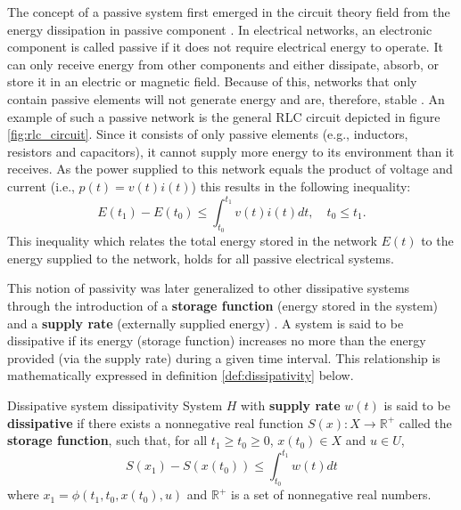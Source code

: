 The concept of a passive system first emerged in the circuit theory field from the energy dissipation in passive component \cite{popovHyperstabilityControlSystems1973}. In electrical networks, an electronic component is called passive if it does not require electrical energy to operate. It can only receive energy from other components and either dissipate, absorb, or store it in an electric or magnetic field. Because of this, networks that only contain passive elements will not generate energy and are, therefore, stable \cite{andersonNetworkAnalysisSynthesis2013}. An example of such a passive network is the general RLC circuit depicted in figure \ref{fig:rlc_circuit}. Since it consists of only passive elements (e.g., inductors, resistors and capacitors), it cannot supply more energy to its environment than it receives. As the power supplied to this network equals the product of voltage and current (i.e., $p \left( t \right)= v \left( t \right) i \left( t \right)$) this results in the following inequality:
\begin{equation}
  E \left( t_1 \right)- E \left( t_0 \right)\le\int_{ t_0 }^{ t_1 } v \left( t \right) i \left( t \right)dt, \quad t_0 \le t_1.
\end{equation}
This inequality which relates the total energy stored in the network $E\left(t\right)$ to the energy supplied to the network, holds for all passive electrical systems.

This notion of passivity was later generalized to other dissipative systems through the introduction of a \textbf{storage function} (energy stored in the system) and a \textbf{supply rate} (externally supplied energy) \cite{willemsDissipativeDynamicalSystems1972a,willemsDissipativeDynamicalSystems1972}. A system is said to be dissipative if its energy (storage function) increases no more than the energy provided (via the supply rate) during a given time interval. This relationship is mathematically expressed in definition \ref{def:dissipativity} below.

\begin{definition}[list text=Dissipative system]{Dissipative system \cite{baoProcessControlPassive2007}}{dissipativity}
  System $H$ with \textbf{supply rate} $w \left( t \right)$ is said to be \textbf{dissipative} if there exists a nonnegative real function $S \left( x \right): X \rightarrow\mathbb{R}^+$ called the \textbf{storage function}, such that, for all $t_1 \geq t_0 \geq 0$, $x\left(t_0\right) \in X$ and $u \in U$,
  \begin{equation}
    S \left( x_1 \right)- S \left( x\left(t_0\right) \right) \le \int_{ t_0 }^{ t_1 } w \left( t \right) dt
  \end{equation}
  where $x_1 = \phi \left(t_1, t_0, x\left(t_0\right), u \right)$ and $\mathbb{R}^+$ is a set of nonnegative real numbers.
\end{definition}

